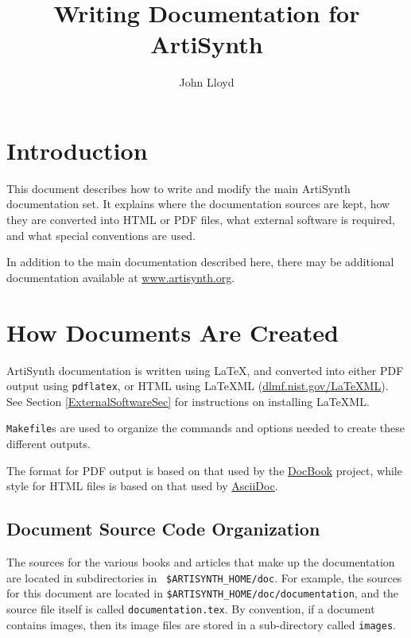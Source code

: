 \documentclass{article}
\title{Writing Documentation for ArtiSynth}
\author{John Lloyd}
\date{}
\begin{document}
\maketitle

\iflatexml{\large\pubdate}\fi

\tableofcontents

\section{Introduction}

This document describes how to write and modify the main ArtiSynth
documentation set. It explains where the documentation sources are
kept, how they are converted into HTML or PDF files, what external
software is required, and what special conventions are used.

In addition to the main documentation described here, there may be
additional documentation available at
\href{http://www.artisynth.org}{www.artisynth.org}.

\section{How Documents Are Created}

ArtiSynth documentation is written using LaTeX, and converted into
either PDF output using {\tt pdflatex}, or HTML using LaTeXML
(\href{http://dlmf.nist.gov/LaTeXML/}{dlmf.nist.gov/LaTeXML}).  See
Section \ref{ExternalSoftwareSec} for instructions on installing LaTeXML.

{\tt Makefile}s are used to organize the commands and options needed
to create these different outputs.

The format for PDF output is based on that used by the
\href{http://www.docbook.org}{DocBook} project, while style for
HTML files is based on that used by
\href{http://www.methods.co.nz/asciidoc}{AsciiDoc}.

\subsection{Document Source Code Organization}

The sources for the various books and articles that make up the
documentation are located in subdirectories in {\tt
\$ARTISYNTH\_HOME/doc}.  For example, the sources for this document
are located in {\tt \$ARTISYNTH\_HOME/doc/documentation}, and the
source file itself is called {\tt documentation.tex}. 
By convention, if a
document contains images, then its image files are stored in a
sub-directory called {\tt images}.
\end{document}
